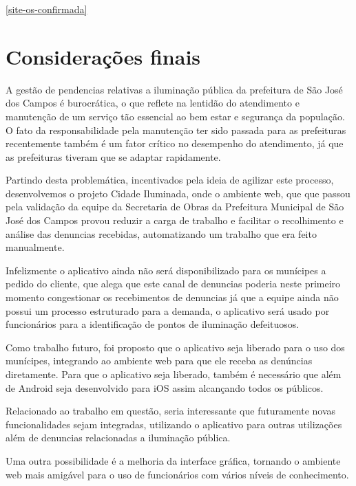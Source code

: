 \documentclass[
	article,			%
	11pt,				%
	oneside,			%
	a4paper,			%
	english,			%
	brazil,				%
	sumario=tradicional
	]{abntex2}
\begin{document}
\ref{site-os-confirmada}
\clearpage

%

\section*{Considerações finais}

A gestão de pendencias relativas a iluminação pública da prefeitura de São José
dos Campos é burocrática, o que reflete na lentidão do atendimento e manutenção
de um serviço tão essencial ao bem estar e segurança da população. O fato da
responsabilidade pela manutenção ter sido passada para as prefeituras recentemente
também é um fator crítico no desempenho do atendimento, já que as prefeituras
tiveram que se adaptar rapidamente.

Partindo desta problemática, incentivados pela ideia de agilizar este processo,
desenvolvemos o projeto Cidade Iluminada, onde o ambiente web, que que passou
pela validação da equipe da Secretaria de Obras da Prefeitura Municipal de São
José dos Campos provou reduzir a carga de trabalho e facilitar o recolhimento e
análise das denuncias recebidas, automatizando um trabalho que era feito manualmente.

Infelizmente o aplicativo ainda não será disponibilizado para os munícipes a
pedido do cliente, que alega que este canal de denuncias poderia  neste primeiro
momento congestionar os recebimentos de denuncias já que a equipe ainda não
possui um processo estruturado para a demanda, o aplicativo será usado por
funcionários para a identificação de pontos de iluminação defeituosos.

Como trabalho futuro, foi proposto que o aplicativo seja liberado para o uso
dos munícipes, integrando ao ambiente web para que ele receba as denúncias
diretamente. Para que o aplicativo seja liberado, também é necessário que
além de Android seja desenvolvido para iOS assim alcançando todos os públicos.

Relacionado ao trabalho em questão, seria interessante que futuramente novas
funcionalidades sejam integradas, utilizando o aplicativo para outras
utilizações além de denuncias relacionadas a iluminação pública.

Uma outra possibilidade é a melhoria da interface gráfica, tornando o ambiente
web mais amigável para o uso de funcionários com vários níveis de conhecimento.
\end{document}
